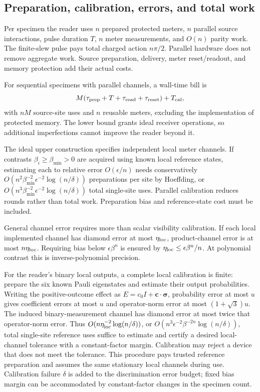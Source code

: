 \documentclass[11pt,a4paper]{article}
\begin{document}
\subsection{Preparation, calibration, errors, and total work}

Per specimen the reader uses $n$ prepared protected meters, $n$ parallel source interactions, pulse duration $T$, $n$ meter measurements, and $O(n)$ parity work. The finite-slew pulse pays total charged action $n\pi/2$. Parallel hardware does not remove aggregate work. Source preparation, delivery, meter reset/readout, and memory protection add their actual costs.

For sequential specimens with parallel channels, a wall-time bill is
\begin{equation}
 M(\tau_{\rm prep}+T+\tau_{\rm read}+\tau_{\rm reset})+T_{\rm cal},
\end{equation}
with $nM$ source-site uses and $n$ reusable meters, excluding the implementation of protected memory. The lower bound grants ideal receiver operations, so additional imperfections cannot improve the reader beyond it.

The ideal upper construction specifies independent local meter channels. If contrasts $\beta_i\ge\beta_{\min}>0$ are acquired using known local reference states, estimating each to relative error $O(\epsilon/n)$ needs conservatively $O(n^2\beta_{\min}^{-2}\epsilon^{-2}\log(n/\delta))$ preparations per site by Hoeffding, or $O(n^3\beta_{\min}^{-2}\epsilon^{-2}\log(n/\delta))$ total single-site uses. Parallel calibration reduces rounds rather than total work. Preparation bias and reference-state cost must be included.

General channel error requires more than scalar visibility calibration. If each local implemented channel has diamond error at most $\eta_{\rm loc}$, product-channel error is at most $n\eta_{\rm loc}$. Requiring bias below $\epsilon\beta^n$ is ensured by $\eta_{\rm loc}\le\epsilon\beta^n/n$. At polynomial contrast this is inverse-polynomial precision.

For the reader's binary local outputs, a complete local calibration is finite: prepare the six known Pauli eigenstates and estimate their output probabilities. Writing the positive-outcome effect as $E=c_0I+\boldsymbol c\cdot\boldsymbol\sigma$, probability error at most $u$ gives coefficient errors at most $u$ and operator-norm error at most $(1+\sqrt3)u$. The induced binary-measurement channel has diamond error at most twice that operator-norm error. Thus $O(n\eta_{\rm loc}^{-2}\log(n/\delta))$, or $O(n^3\epsilon^{-2}\beta^{-2n}\log(n/\delta))$, total single-site reference uses suffice to estimate and certify a desired local-channel tolerance with a constant-factor margin. Calibration may reject a device that does not meet the tolerance. This procedure pays trusted reference preparation and assumes the same stationary local channels during use. Calibration failure $\delta$ is added to the discrimination error budget; fixed bias margin can be accommodated by constant-factor changes in the specimen count.
\end{document}
